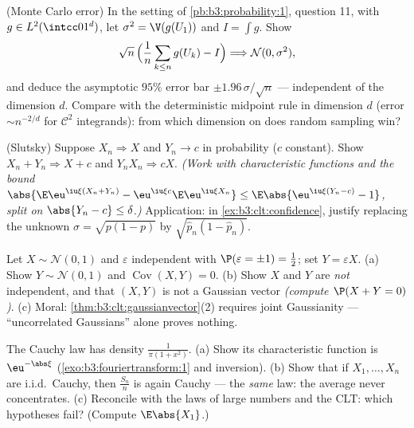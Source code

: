 \begin{exercise}[$\star\star$]\label{exo:b3:clt:7}
(Monte Carlo error) In the setting of
\cref{pb:b3:probability:1}, question 11, with $g \in
L^2(\intcc01^d)$, let $\sigma^2 = \V(g(U_1))$ and $I = \int
g$. Show
\[
\sqrt n\,\Bigl(\frac1n\sum_{k\leq n}g(U_k) - I\Bigr)
\Longrightarrow \mathcal N(0, \sigma^2),
\]
and deduce the asymptotic $95\%$ error bar $\pm
1.96\,\sigma/\sqrt n$ --- independent of the dimension $d$.
Compare with the deterministic midpoint rule in dimension
$d$ (error $\sim n^{-2/d}$ for $\mathcal C^2$ integrands):
from which dimension on does random sampling win?
\end{exercise}

\begin{exercise}[$\star\star\star$]\label{exo:b3:clt:8}
(Slutsky) Suppose $X_n \Rightarrow X$ and $Y_n \to c$ in
probability ($c$ constant). Show $X_n + Y_n \Rightarrow X +
c$ and $Y_nX_n \Rightarrow cX$. \emph{(Work with
characteristic functions and the bound $\abs{\E\eu^{\iu\xi
(X_n+Y_n)} - \eu^{\iu\xi c}\E\eu^{\iu\xi X_n}} \leq
\E\abs{\eu^{\iu\xi(Y_n - c)} - 1}$, split on $\abs{Y_n - c}
\leq \delta$.)} Application: in
\cref{ex:b3:clt:confidence}, justify replacing the unknown
$\sigma = \sqrt{p(1-p)}$ by $\sqrt{\hat p_n(1 - \hat
p_n)}$.
\end{exercise}

\begin{exercise}[$\star\star\star$]\label{exo:b3:clt:9}
Let $X \sim \mathcal N(0,1)$ and $\varepsilon$ independent
with $\P(\varepsilon = \pm1) = \frac12$; set $Y =
\varepsilon X$.
(a) Show $Y \sim \mathcal N(0,1)$ and
$\operatorname{Cov}(X, Y) = 0$.
(b) Show $X$ and $Y$ are \emph{not} independent, and that
$(X, Y)$ is not a Gaussian vector \emph{(compute $\P(X + Y =
0)$)}.
(c) Moral: \cref{thm:b3:clt:gaussianvector}(2) requires
joint Gaussianity --- ``uncorrelated Gaussians'' alone
proves nothing.
\end{exercise}

\begin{exercise}[$\star\star$]\label{exo:b3:clt:10}
The Cauchy law has density $\frac1{\pi(1 + x^2)}$.
(a) Show its characteristic function is $\eu^{-\abs\xi}$
(\cref{exo:b3:fouriertransform:1} and inversion).
(b) Show that if $X_1, \dots, X_n$ are i.i.d.\ Cauchy, then
$\frac{S_n}n$ is again Cauchy --- the \emph{same} law: the
average never concentrates.
(c) Reconcile with the laws of large numbers and the CLT:
which hypotheses fail? (Compute $\E\abs{X_1}$.)
\end{exercise}

